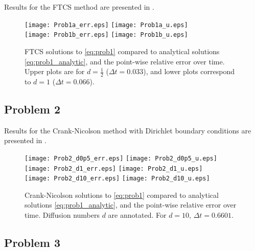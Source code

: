 \documentclass[11pt]{article}
\begin{document}
Results for the FTCS method are presented in .

\begin{figure}[h!]
\begin{center}
\texttt{[image: Prob1a\_err.eps]}
\hspace*{-0.2cm}
\texttt{[image: Prob1a\_u.eps]}
\\
\texttt{[image: Prob1b\_err.eps]}
\hspace*{-0.2cm}
\texttt{[image: Prob1b\_u.eps]}
\\[-0.5cm]
\caption{FTCS solutions to \eqref{eq:prob1} compared to analytical solutions \eqref{eq:prob1_analytic}, and the point-wise relative error over time. Upper plots are for $d=\tfrac{1}{2}$ ($\Delta t = 0.033$), and lower plots correspond to $d=1$ ($\Delta t = 0.066$).}
\label{fig:Prob1}
\end{center}
\end{figure}

\subsection{Problem 2}

Results for the Crank-Nicolson method with Dirichlet boundary conditions are presented in .

\begin{figure}[h!]
\begin{center}
\texttt{[image: Prob2\_d0p5\_err.eps]}
\hspace*{-0.2cm}
\texttt{[image: Prob2\_d0p5\_u.eps]}
\\
\texttt{[image: Prob2\_d1\_err.eps]}
\hspace*{-0.2cm}
\texttt{[image: Prob2\_d1\_u.eps]}
\\
\texttt{[image: Prob2\_d10\_err.eps]}
\hspace*{-0.2cm}
\texttt{[image: Prob2\_d10\_u.eps]}
\\[-0.5cm]
\caption{Crank-Nicolson solutions to \eqref{eq:prob1} compared to analytical solutions \eqref{eq:prob1_analytic}, and the point-wise relative error over time. Diffusion numbers $d$ are annotated. For $d = 10$, $\Delta t = 0.6601$.}
\label{fig:Prob2}
\end{center}
\end{figure}

\subsection{Problem 3}
\end{document}
